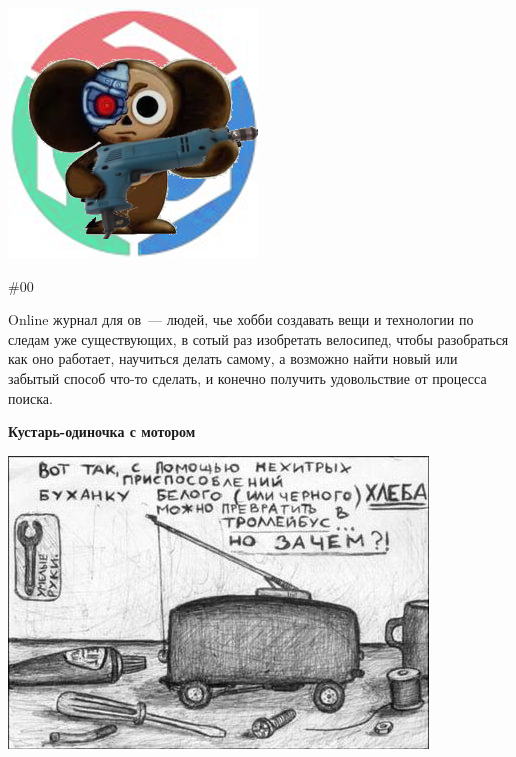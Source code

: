 \documentclass{magazine}
\begin{document}
\begin{titlepage}

\begin{multicols}{2}

\noindent\includegraphics[width=0.9\columnwidth]{logo/chbz.png}

\columnbreak

{\Huge \Scr \#00}\bigskip

\noindent\textsf{Online журнал для \scr ов\ --- людей, чье хобби создавать вещи
и технологии по следам уже существующих, в сотый раз изобретать велосипед, чтобы
разобраться как оно работает, научиться делать самому, а возможно найти новый
или забытый способ что-то сделать, и конечно получить удовольствие от процесса
поиска.}

\end{multicols}

\begin{center}
{\Huge\textbf{Кустарь-одиночка с мотором}}
{\large\bigskip}
\end{center}

\noindent\includegraphics[width=\textwidth]{logo/trolley.jpg}


\end{titlepage}
\end{document}
